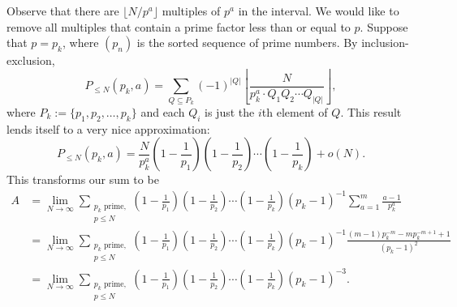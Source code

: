 \documentclass[a4paper, 12pt]{article}
\begin{document}
\begin{solution}
    Observe that there are \( \lfloor N / p^a \rfloor \) multiples of \( p^a \) in the interval. We would like to remove all multiples that contain a prime factor less than or equal to \( p \). Suppose that \( p = p_k \), where \( (p_n) \) is the sorted sequence of prime numbers. By inclusion-exclusion,
    \[
        P_{\le N}(p_k, a) = \sum_{Q \subseteq P_k} (-1)^{|Q|} \left \lfloor \frac{N}{p_k^a \cdot Q_1 Q_2 \cdots Q_{|Q|}}\right\rfloor
    ,\]
    where \( P_k := \{ p_1, p_2, \ldots, p_{k} \} \) and each \( Q_i \) is just the \( i \)th element of \( Q \). This result lends itself to a very nice approximation:
    \[
        P_{\le N}(p_k, a) = \frac{N}{p_k^a} \left( 1 - \frac{1}{p_1} \right) \left( 1 - \frac{1}{p_2} \right) \cdots \left( 1 - \frac{1}{p_{k}} \right) + o(N)
    .\]
    This transforms our sum to be
    \begin{align*}
        A &= \lim_{N \to \infty} \sum\limits_{\substack{p_k \textrm{ prime,}  \\ p \le N}} \left( 1 - \frac{1}{p_1} \right) \left( 1 - \frac{1}{p_2} \right) \cdots \left( 1 - \frac{1}{p_{k}} \right) (p_k-1)^{-1} \sum_{a = 1}^{m} \frac{a - 1}{p_k^a} \\
        &= \lim_{N \to \infty} \sum\limits_{\substack{p_k \textrm{ prime,}  \\ p \le N}} \left( 1 - \frac{1}{p_1} \right) \left( 1 - \frac{1}{p_2} \right) \cdots \left( 1 - \frac{1}{p_{k}} \right) (p_k-1)^{-1} \frac{(m-1)p_k^{-m} - m p_k^{-m + 1} + 1}{(p_k-1)^2} \\
        &= \lim_{N \to \infty} \sum\limits_{\substack{p_k \textrm{ prime,}  \\ p \le N}} \left( 1 - \frac{1}{p_1} \right) \left( 1 - \frac{1}{p_2} \right) \cdots \left( 1 - \frac{1}{p_{k}} \right) (p_k-1)^{-3}
    .\end{align*}
\end{solution}
\end{document}
